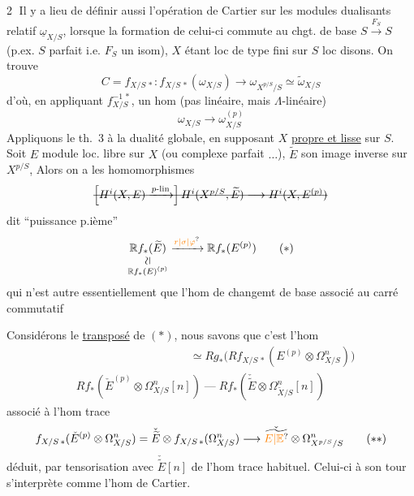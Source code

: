 \textcircled{2} Il y a lieu de définir aussi l'opération de Cartier  sur les modules dualisants relatif $\underline{\omega}_{X/S}$,  lorsque la formation de celui-ci commute au chgt. de base $S\xrightarrow{F_S}S$  (p.ex. $S$ parfait i.e. $F_S$ un isom),  $X$ étant loc de type fini sur $S$ loc  disons. On trouve
\[
 C=f_{X/S\,*}:f_{X/S\,*}(\omega_{X/S})\longrightarrow
 \omega_{X^{p/S}/S}\simeq\widetilde\omega_{X/S}
\]
d'où, en appliquant $f_{X/S}^{-1\,*}$,  un hom (pas linéaire, mais $\Lambda$-linéaire)
\[
 \omega_{X/S}\longrightarrow\omega_{X/S}^{(p)}
\]
Appliquons le th.~3 à la dualité globale, en supposant $X$ \uline{propre et lisse} sur $S$. Soit $E$ module loc. libre sur $X$ (ou complexe parfait $\ldots$), $\widetilde E$ son image inverse sur $X^{p/S}$,  Alors on a les homomorphismes
\[
\deleted{\left[H^i(X,E)\xrightarrow{p\text{-lin}}\right]H^i(X^{p/S},\widetilde E)\longrightarrow H^i(X,E^{(p)})}
\]
dit ``puissance p.ième''
\[
 \underset{\substack{\rotatebox{90}{$\simeq$}\\\mathbb R f_*(E)^{(p)}}}{\mathbb R f_*(\widetilde E)}
 \xrightarrow{\unsure{r|\sigma|\varphi}}\mathbb R f_*(E^{(p)})\tag*{($\ast$)}
\]
qui n'est autre essentiellement que l'hom de changemt de base associé au carré commutatif


Considérons le \uline{transposé} de $(\ast)$, nous savons que c'est l'hom
\[
\begin{aligned}
&\hspace{10em}\simeq Rg_*\bigl(Rf_{X/S\,*}(E^{(p)}\otimes\Omega^n_{X/S})\bigr)\\
&Rf_*(\check E^{(p)}\otimes\Omega^n_{X/S}[n])\mathrel{\text{---}}
 Rf_*(\check{\widetilde E}\otimes\Omega^n_{\widetilde X/S}[n])
\end{aligned}
\]
associé à l'hom trace
\[
 f_{X/S\,*}(\check E^{(p)}\otimes\Omega^n_{X/S})
 =\check{\widetilde E}\otimes f_{X/S\,*}(\Omega^n_{X/S})
 \longrightarrow\check{\widetilde{\unsure{E|\mathbb E}}}\otimes\Omega^n_{X^{p/S}/S}\tag*{($\ast\ast$)}
\]
déduit, par tensorisation avec $\check{\widetilde E}[n]$  de l'hom trace habituel. Celui-ci à son tour s'interprète comme l'hom  de Cartier.

